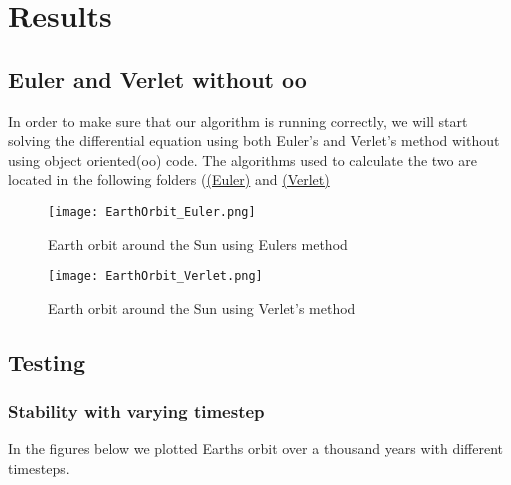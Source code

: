 \documentclass[../main.tex]{subfiles}
\begin{document}
\section{Results}\label{results}
\subsection{Euler and Verlet without oo}
In order to make sure that our algorithm is running correctly, we will start solving the differential equation using both Euler's and Verlet's method without using object oriented(oo) code. The algorithms used to calculate the two are located in the following folders (\href{https://github.com/kmaasrud/Project-5/tree/master/code/Earth-Sun_Euler-FWD}{(Euler)} and \href{https://github.com/kmaasrud/Project-5/tree/master/code/Earth-Sun_Verlet}{(Verlet)}

\begin{figure}[!h]
  \centering
  \parbox{5cm}{
  \texttt{[image: EarthOrbit\_Euler.png]}
  \caption{Earth orbit around the Sun using Eulers method}
  \label{fig:EarthOrbit_Euler}}
  \qquad
  \begin{minipage}{5cm}
    \texttt{[image: EarthOrbit\_Verlet.png]}
    \caption{Earth orbit around the Sun using Verlet's method}
    \label{fig:EarthOrbit_Verlet}
  \end{minipage}
  \end{figure}
\FloatBarrier




\subsection{Testing}
\subsubsection{Stability with varying timestep} \label{sec:results-test-timestep}
In the figures below we plotted Earths orbit over a thousand years with different timesteps.
\end{document}
